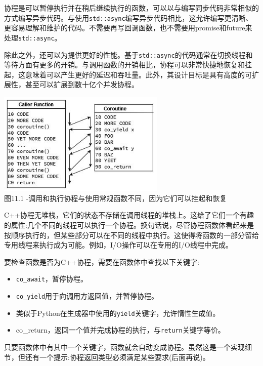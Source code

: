 
协程是可以暂停执行并在稍后继续执行的函数，可以以与编写同步代码非常相似的方式编写异步代码。与使用\texttt{std::async}编写异步代码相比，这允许编写更清晰、更容易理解和维护的代码。不需要再写回调函数，也不需要用promise和future来处理\texttt{std::async}。

除此之外，还可以为提供更好的性能。基于\texttt{std::async}的代码通常在切换线程和等待方面有更多的开销。与调用函数的开销相比，协程可以非常快捷地恢复和挂起，这意味着可以产生更好的延迟和吞吐量。此外，其设计目标是具有高度的可扩展性，甚至可以扩展到数十亿个并发协程。

\begin{center}
\includegraphics[width=0.6\textwidth]{content/3/chapter11/images/1.jpg}\\
图11.1 -调用和执行协程与使用常规函数不同，因为它们可以挂起和恢复
\end{center}

C++协程无堆栈，它们的状态不存储在调用线程的堆栈上。这给了它们一个有趣的属性:几个不同的线程可以执行一个协程。换句话说，尽管协程函数体看起来是按顺序执行的，但某些部分可以在不同的线程中执行。这使得将函数的一部分留给专用线程来执行成为可能。例如，I/O操作可以在专用的I/O线程中完成。

要检查函数是否为C++协程，需要在函数体中查找以下关键字:

\begin{itemize}
\item 
\texttt{co\_await}，暂停协程。

\item 
\texttt{co\_yield}用于向调用方返回值，并暂停协程。

\item 
类似于Python在生成器中使用的\texttt{yield}关键字，允许惰性生成值。

\item 
co\_return，返回一个值并完成协程的执行，与\texttt{return}关键字等价。
\end{itemize}

只要函数体中有其中一个关键字，函数就会自动变成协程。虽然这是一个实现细节，但还有一个提示:协程返回类型必须满足某些要求(后面再说)。

